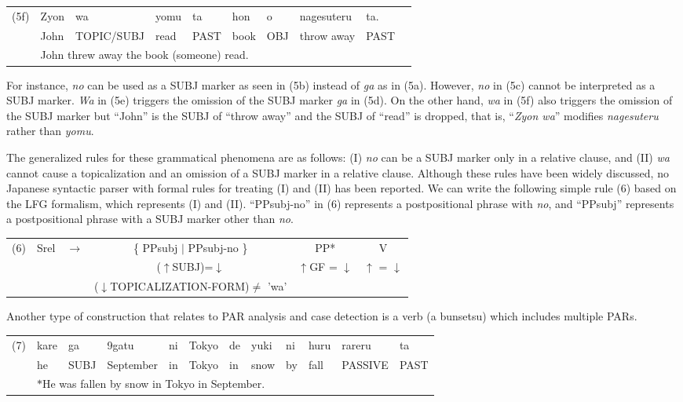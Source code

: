\documentclass[english]{jnlp_1.4_rep}
\begin{document}
\noindent
\begin{tabular}{ll@{ }l@{ }l@{ }l@{ }l@{ }l@{ }l@{ }l@{ }l}
(5f) & Zyon&wa&yomu&ta&hon&o&nagesuteru&ta.\\
     & John&TOPIC/SUBJ&read&PAST&book&OBJ&throw away&PAST \\
     & \multicolumn{9}{l}{\quad John threw away the book (someone) read.}
\end{tabular}
\vspace{4pt}

For instance, \textit{no} can be used as a SUBJ marker as seen in (5b) instead of \textit{ga}
as in (5a).  However, \textit{no} in (5c) cannot be interpreted as a SUBJ
marker.  \textit{Wa} in (5e) triggers the omission of the SUBJ marker \textit{ga} in (5d).
On the other hand, \textit{wa} in (5f) also triggers the omission of the SUBJ
marker but ``John'' is the SUBJ of ``throw away'' and the SUBJ of ``read''
is dropped, that is, ``\textit{Zyon wa}'' modifies \textit{nagesuteru} rather than \textit{yomu}.

The generalized rules for these grammatical phenomena are as follows:
(I) \textit{no} can be a SUBJ marker only in a relative clause, and
(II) \textit{wa} cannot cause a topicalization and an omission of a
SUBJ marker in a relative clause.  Although these rules have been
widely discussed, no Japanese syntactic parser with formal rules
for treating (I) and (II) has been reported.  We can write the following
simple rule (6) based on the LFG formalism, which represents (I) and
(II).  ``PPsubj-no'' in (6) represents a postpositional phrase with
\textit{no}, and ``PPsubj'' represents a postpositional phrase with a
SUBJ marker other than \textit{no}.

\vspace{2pt}
\noindent
\begin{tabular}{ll@{ }l@{ }c@{ }c@{ }c}
(6) & Srel & $\longrightarrow$  & \{ PPsubj $|$  PPsubj-no \} & PP* & V\\
    &      &                    & ($\uparrow$SUBJ)=$\downarrow$ & $\uparrow$GF = $\downarrow$ & $\uparrow$ = $\downarrow$ \\
    & & & ($\downarrow$TOPICALIZATION-FORM)$\neq$ 'wa' & & 
\end{tabular}

\noindent
Another type of construction that relates to PAR analysis and case
detection is a verb (a bunsetsu) which includes multiple PARs.

\vspace{2pt}
\noindent
\begin{tabular}{ll@{ }l@{ }l@{ }l@{ }l@{ }l@{ }l@{ }l@{ }l@{ }l@{ }l}
(7) & kare&ga&9gatu&ni&Tokyo&de&yuki&ni&huru&rareru&ta\\
    & he&SUBJ&September&in&Tokyo&in&snow&by&fall&PASSIVE&PAST  \\
    & \multicolumn{10}{l}{\quad $*$He was fallen by snow in Tokyo in September.}
\end{tabular}
\end{document}
